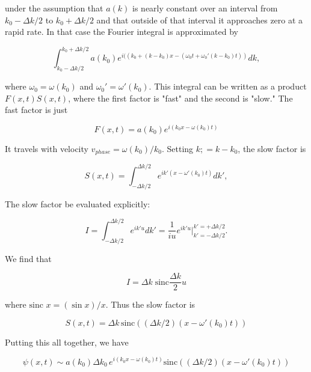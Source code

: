 under the assumption that $a(k)$ is nearly constant over an interval from $k_0 -\Delta k/2$ to $k_0 + \Delta k/2$ and that outside of that interval it approaches zero at a rapid rate.  In that case the Fourier integral is approximated by

\begin{equation}
 \int_{k_0 - \Delta k/2}^{k_0 + \Delta k/2}  a(k_0)e^{i((k_0 + (k - k_0)x - (\omega_0t + \omega_0'(k - k_0)t))}dk,
\end{equation}

where $\omega_0 = \omega(k_0)$ and $\omega_0' = \omega'(k_0)$.
This integral can be written as a product $F(x,t)S(x,t)$, where the first factor is "fast" and the second is "slow."  The fast factor is just

\begin{equation}
F(x,t) = a(k_0)e^{ i(k_0x - \omega(k_0)t) }
\end{equation}

It travels with velocity $v_{phase} = \omega(k_0)/k_0$.  Setting $k; = k- k_0$, the slow factor is 

\begin{equation}
S(x,t) = \int_{-\Delta k/2}^{\Delta k/2} e^{ik'\left(x - \omega'(k_0)t\right)} dk',
\end{equation}

The slow factor be evaluated explicitly:

\begin{equation}
I = \int_{-\Delta k/2}^{\Delta k/2} e^{ik'u} dk' = \frac{1}{iu} e^{ik'u}\Big\vert_{k' = - \Delta k/2}^{k' = +\Delta k/2}.
\end{equation}

We find that 

\begin{equation}
I = \Delta k\; \text{sinc}\frac{\Delta k}{2}u
\end{equation}

where $\text{sinc } x = (\sin x )/x$.  Thus the slow factor is

\begin{equation}
S(x,t) = \Delta k\, \text{sinc}(  (\Delta k/2)(x - \omega'(k_0)t)  )
\end{equation}


Putting this all together, we have

\begin{equation}
\psi(x,t) \sim a(k_0)\Delta k_0\, e^{i(k_0x - \omega(k_0)t)}\text{sinc}(  (\Delta k/2)(x - \omega'(k_0)t)  )
\end{equation}

